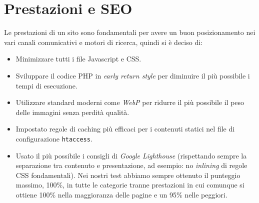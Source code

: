 \section{Prestazioni e SEO}

Le prestazioni di un sito sono fondamentali per avere un buon posizionamento nei vari canali comunicativi e motori di ricerca, quindi si è deciso di:
\begin{itemize}
    \item Minimizzare tutti i file Javascript e CSS.
    \item Sviluppare il codice PHP in \textit{early return style} per diminuire il più possibile i tempi di esecuzione.
    \item Utilizzare standard moderni come \textit{WebP} per ridurre il più possibile il peso delle immagini senza perdità qualità.
    \item Impostato regole di caching più efficaci per i contenuti statici nel file di configurazione \texttt{htaccess}.
    \item Usato il più possibile i consigli di \textit{Google Lighthouse} (rispettando sempre la separazione tra contenuto e presentazione, ad  esempio: no \textit{inlining} di regole CSS fondamentali). Nei nostri test abbiamo sempre ottenuto il punteggio massimo, 100\%, in tutte le categorie tranne prestazioni in cui comunque si ottiene 100\% nella maggioranza delle pagine e un 95\% nelle peggiori.
\end{itemize}
